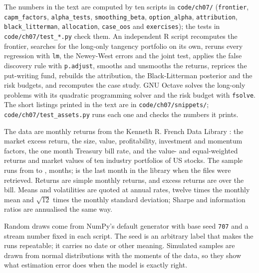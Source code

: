 \begin{chapterrefs}
\begin{keybox}
The numbers in the text are computed by ten scripts in \texttt{code/ch07/} (\texttt{frontier},
\texttt{capm\_factors}, \texttt{alpha\_tests}, \texttt{smoothing\_beta}, \texttt{option\_alpha},
\texttt{attribution}, \texttt{black\_litterman}, \texttt{allocation}, \texttt{case\_oos} and
\texttt{exercises}); the tests in \texttt{code/ch07/test\_*.py} check them. An independent R script
recomputes the frontier, searches for the long-only tangency portfolio on its own, reruns every
regression with \texttt{lm}, the Newey-West errors and the joint test, applies the false discovery
rule with \texttt{p.adjust}, smooths and unsmooths the returns, reprices the put-writing fund, rebuilds
the attribution, the Black-Litterman posterior and the risk budgets, and recomputes the case study.
GNU Octave solves the long-only problems with its quadratic programming solver and the risk budget
with \texttt{fsolve}. The short listings printed in the text are in \texttt{code/ch07/snippets/};
\texttt{code/ch07/test\_assets.py} runs each one and checks the numbers it prints.

The data are monthly returns from the Kenneth R. French Data Library \parencite{frenchlib}: the market
excess return, the size, value, profitability, investment and momentum factors, the one month
Treasury bill rate, and the value- and equal-weighted returns and market values of ten industry
portfolios of US stocks. The sample runs from \fqFirst{} to \fqLast, \fqT{} months; \fqLast{} is
the last month in the library when the files were retrieved. Returns are simple monthly returns, and
excess returns are over the bill. Means and volatilities are quoted at annual rates, twelve times the
monthly mean and $\sqrt{12}$ times the monthly standard deviation; Sharpe and information ratios are
annualised the same way.

Random draws come from NumPy's default generator with base seed \texttt{707} and a stream number
fixed in each script. The seed is an arbitrary label that makes the runs repeatable; it carries no
date or other meaning. Simulated samples are drawn from normal distributions with the moments of the
data, so they show what estimation error does when the model is exactly right.


\end{keybox}
\end{chapterrefs}
